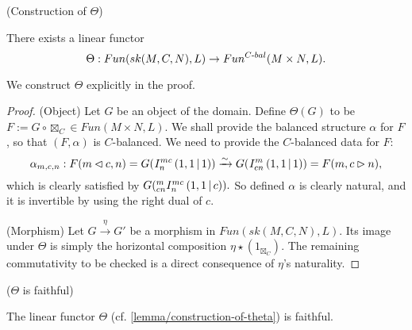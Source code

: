 \begin{lemma}\label{lemma/construction-of-theta} (Construction of $\Theta$)

  \noindent There exists a linear functor
  \[
    \Theta: Fun(sk(M,C,N), L) \to Fun^{C{\text -}bal}(M \times N, L).
  \]
\end{lemma}

\noindent We construct $\Theta$ explicitly in the proof.

\begin{proof}
  \noindent (Object) Let $G$ be an object of the domain. Define $\Theta(G)$ to
  be $F := G \circ \boxtimes_{C} \in Fun(M \times N, L)$. We shall provide the
  balanced structure $\alpha$ for $F$, so that $(F, \alpha)$ is $C$-balanced. 
  We need to provide the $C$-balanced data for $F$:
  \[
    \alpha_{m,c,n}: F(m \lhd c, n) =
    G({}^{}_{} I^{mc}_{n} \left( 1, 1 \,\middle|\, 1 \right))
    \xrightarrow{\sim} G({}^{}_{} I^{m}_{cn} \left( 1, 1 \,\middle|\, 1 \right))
    = F(m, c \rhd n),
  \]
  which is clearly satisfied by $G({}^{m}_{cn} I^{mc}_{n} \left( 1, 1 \,\middle|\, c \right)).$ So defined
  $\alpha$ is clearly natural, and it is invertible by using the right dual of $c$.

  \noindent (Morphism) Let $G \xrightarrow{\eta} G'$ be a morphism in
  $Fun(sk(M,C,N), L)$. Its image under $\Theta$ is simply the horizontal
  composition $\eta \star (1_{\boxtimes_{C}})$. The remaining commutativity to be checked
  is a direct consequence of $\eta$'s naturality.
\end{proof}

\begin{lemma}\label{lemma/theta-is-faithful} ($\Theta$ is faithful)

  \noindent The linear functor $\Theta$ (cf. \ref{lemma/construction-of-theta}) is faithful.
\end{lemma}

